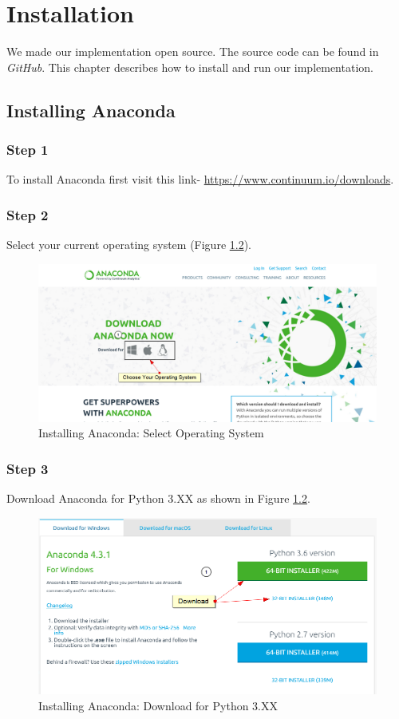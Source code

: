 \chapter{Installation} 
\label{chap:install}

We made our implementation open source. The source code can be found in {\it GitHub}. This chapter describes how to install and run our implementation.

\section{Installing Anaconda}

\subsection{Step 1}
To install Anaconda first visit this link- \url{https://www.continuum.io/downloads}.

\subsection{Step 2}
Select your current operating system (Figure \ref{fig:Anaconda1}).
\begin{figure}[!hbt]
\centering
\includegraphics[width=0.8\linewidth]{./img/conda-download1}
\caption{Installing Anaconda: Select Operating System}
\label{fig:Anaconda1}
\end{figure}

\subsection{Step 3}
Download Anaconda for Python 3.XX as shown in Figure \ref{fig:Anaconda1}.
\begin{figure}[!hbt]
\centering
\includegraphics[width=0.8\linewidth]{./img/conda-download2}
\caption{Installing Anaconda: Download for Python 3.XX}
\label{fig:Anaconda1}
\end{figure}

